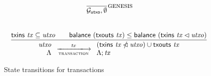 \documentclass[11pt,a4paper]{article}
\begin{document}
\begin{figure}


\begin{equation*}
\frac{
}{
\mathcal{G}_{\mathsf{utxo}}, \emptyset
}
\textsc{genesis}
\end{equation*}
%
\\[1em]
%
\begin{equation*}
\frac{
  \fun{txins} ~ \var{tx} \subseteq \var{utxo} \qquad
  \fun{balance}~(\fun{txouts}~\var{tx}) \leq \fun{balance}~(\fun{txins} ~ \var{tx} \restrictdom \var{utxo})
}{
  \begin{array}{r}
    \var{utxo} \\
    \Lambda
  \end{array}
  \transitionarrow{transaction}{\var{tx}}
  \begin{array}{l}
  (\fun{txins} ~ \var{tx} \subtractdom \var{utxo}) \union \fun{txouts}~\var{tx} \\
  \Lambda ; \var{tx}
  \end{array}
}
\end{equation*}

\caption{State transitions for transactions}
\label{fig:transaction_transitions}
\end{figure}
\end{document}
